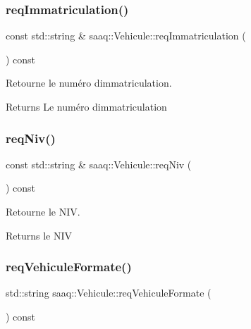 \subsubsection{\texorpdfstring{req\+Immatriculation()}{reqImmatriculation()}}
{\footnotesize\ttfamily const std\+::string \& saaq\+::\+Vehicule\+::req\+Immatriculation (\begin{DoxyParamCaption}{ }\end{DoxyParamCaption}) const}



Retourne le numéro d\textquotesingle{}immatriculation. 

\begin{DoxyReturn}{Returns}
Le numéro d\textquotesingle{}immatriculation 
\end{DoxyReturn}
\mbox{\label{classsaaq_1_1Vehicule_a8a7c31860afb58614a44ba89a9ddc224}} 
\subsubsection{\texorpdfstring{req\+Niv()}{reqNiv()}}
{\footnotesize\ttfamily const std\+::string \& saaq\+::\+Vehicule\+::req\+Niv (\begin{DoxyParamCaption}{ }\end{DoxyParamCaption}) const}



Retourne le N\+IV. 

\begin{DoxyReturn}{Returns}
le N\+IV 
\end{DoxyReturn}
\mbox{\label{classsaaq_1_1Vehicule_a9d0ff95273ecd7858cf9bd12aac359ba}} 
\subsubsection{\texorpdfstring{req\+Vehicule\+Formate()}{reqVehiculeFormate()}}
{\footnotesize\ttfamily std\+::string saaq\+::\+Vehicule\+::req\+Vehicule\+Formate (\begin{DoxyParamCaption}{ }\end{DoxyParamCaption}) const}



